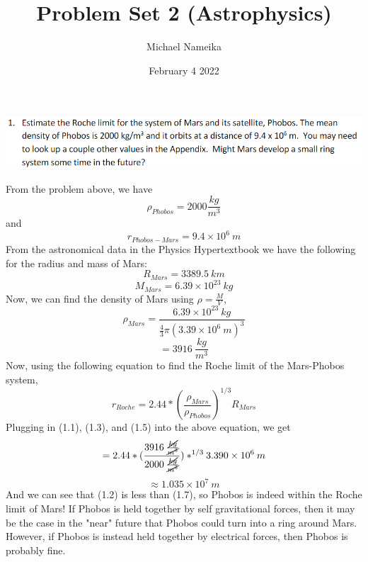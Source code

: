 \documentclass{article}
\title{Problem Set 2 (Astrophysics)}
\author{Michael Nameika}
\date{February 4 2022}
\begin{document}
\maketitle

\section{}
\includegraphics[scale = 0.8]{probset2prob1.PNG}


From the problem above, we have 
\begin{equation}
    \rho_{Phobos} = 2000 \frac{kg}{m^3}
\end{equation}
and
\begin{equation}
    r_{Phobos-Mars} = 9.4 \times 10^6 \:m
\end{equation}
From the astronomical data in the Physics Hypertextbook we have the following for the radius and mass of Mars:
\begin{equation}
    R_{Mars} = 3389.5 \: km
\end{equation}
\begin{equation}
    M_{Mars} = 6.39 \times 10^{23} \: kg
\end{equation}
Now, we can find the density of Mars using $\rho = \frac{M}{V}$,
  \[  \rho_{Mars} = \frac{6.39 \times 10^{23} \: kg}{\frac{4}{3}\pi(3.39 \times 10^6 \:m)^3}\]
\begin{equation}
    = 3916 \: \frac{kg}{m^3}
\end{equation}
Now, using the following equation to find the Roche limit of the Mars-Phobos system,
\begin{equation}
    r_{Roche} = 2.44*(\frac{\rho_{Mars}}{\rho_{Phobos}})^{1/3}R_{Mars}
\end{equation}
Plugging in (1.1), (1.3), and (1.5) into the above equation, we get
\[ = 2.44*(\frac{3916 \: \frac{\cancel{kg}}{\cancel{m^3}}}{2000 \: \frac{\cancel{kg}}{\cancel{m^3}}})*^{1/3}3.390\times 10^6 \: m\]
\begin{equation}
    \approx 1.035\times 10^7 \: m
\end{equation}
And we can see that (1.2) is less than (1.7), so Phobos is indeed within the Roche limit of Mars! If Phobos is held together by self gravitational forces, then it may be the case in the "near" future that Phobos could turn into a ring around Mars. However, if Phobos is instead held together by electrical forces, then Phobos is probably fine.
\end{document}
